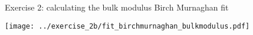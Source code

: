\documentclass[xcolor=table]{beamer}
\begin{document}
\begin{frame}{Exercise 2: calculating the bulk modulus}
  Birch Murnaghan fit
  \begin{center}
    \texttt{[image: ../exercise\_2b/fit\_birchmurnaghan\_bulkmodulus.pdf]}
  \end{center}
\end{frame}

% 
\end{document}
